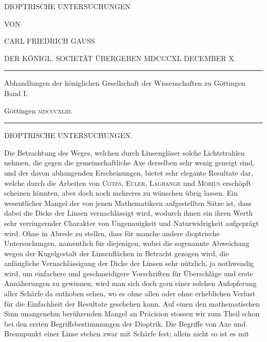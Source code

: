 \clearpage
\thispagestyle{empty}
\begin{center}
\vspace*{0.6in}
{\Large DIOPTRISCHE UNTERSUCHUNGEN\par}
\vspace{0.6in}
VON\par
\vspace{0.5in}
{\large CARL FRIEDRICH GAUSS\par}
\vspace{0.4in}
DER KÖNIGL. SOCIETÄT ÜBERGEBEN MDCCCXL DECEMBER X.\par
\vfill
\rule{0.85\textwidth}{0.3pt}\par
Abhandlungen der königlichen Gesellschaft der Wissenschaften zu Göttingen Band I.\par
Göttingen \textsc{mdcccxliii}.\par
\rule{0.85\textwidth}{0.3pt}
\end{center}
\clearpage
{}
\renewcommand{\Article}[1]{\par\medskip\Needspace{4\baselineskip}\pdfbookmark[1]{Art. #1}{dioptrische-art-#1}\centerline{\textbf{#1.}}\nobreak\smallskip}
\begin{center}
DIOPTRISCHE UNTERSUCHUNGEN.
\end{center}
\medskip
Die Betrachtung des Weges, welchen durch Linsengläser solche Lichtstrahlen nehmen, die gegen die gemeinschaftliche Axe derselben sehr wenig geneigt sind, und der davon abhangenden Erscheinungen, bietet sehr elegante Resultate dar, welche durch die Arbeiten von \textsc{Cotes}, \textsc{Euler}, \textsc{Lagrange} und \textsc{Möbius} erschöpft scheinen könnten, aber doch noch mehreres zu wünschen übrig lassen. Ein wesentlicher Mangel der von jenen Mathematikern aufgestellten Sätze ist, dass dabei die Dicke der Linsen vernachlässigt wird, wodurch ihnen ein ihren Werth sehr verringernder Charakter von Ungenauigkeit und Naturwidrigkeit aufgeprägt wird. Ohne in Abrede zu stellen, dass für manche andere dioptrische Untersuchungen, namentlich für diejenigen, wobei die sogenannte Abweichung wegen der Kugelgestalt der Linsenflächen in Betracht gezogen wird, die anfängliche Vernachlässigung der Dicke der Linsen sehr nützlich, ja nothwendig wird, um einfachere und geschmeidigere Vorschriften für Überschläge und erste Annäherungen zu gewinnen, wird man sich doch gern einer solchen Aufopferung aller Schärfe da enthoben sehen, wo es ohne allen oder ohne erheblichen Verlust für die Einfachheit der Resultate geschehen kann. Auf einen den mathematischen Sinn unangenehm berührenden Mangel an Präcision stossen wir zum Theil schon bei den ersten Begriffsbestimmungen der Dioptrik. Die Begriffe von Axe und Brennpunkt einer Linse stehen zwar mit Schärfe fest; allein nicht so ist es mit
